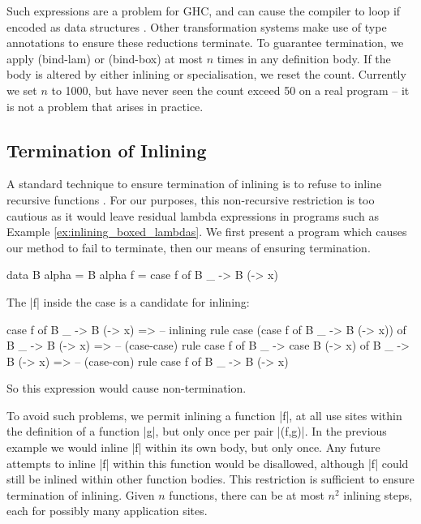 \documentclass{sigplanconf}
\begin{document}
Such expressions are a problem for GHC, and can cause the compiler to loop if encoded as data structures \cite{spj:inlining}. Other transformation systems \cite{chin:higher_order_removal} make use of type annotations to ensure these reductions terminate. To guarantee termination, we apply (bind-lam) or (bind-box) at most $n$ times in any definition body. If the body is altered by either inlining or specialisation, we reset the count. Currently we set $n$ to 1000, but have never seen the count exceed 50 on a real program -- it is not a problem that arises in practice.

\subsection{Termination of Inlining}

A standard technique to ensure termination of inlining is to refuse to inline recursive functions \cite{spj:inlining}. For our purposes, this non-recursive restriction is too cautious as it would leave residual lambda expressions in programs such as Example \ref{ex:inlining_boxed_lambdas}. We first present a program which causes our method to fail to terminate, then our means of ensuring termination.

\begin{example}
\begin{code}
data B alpha = B alpha
f = case  f of
          B _ -> B (\x -> x)
\end{code}

\noindent The |f| inside the case is a candidate for inlining:

\ignore\begin{code}
case f of B _ -> B (\x -> x)
    => -- inlining rule
case (case f of B _ -> B (\x -> x)) of B _ -> B (\x -> x)
    => -- (case-case) rule
case f of B _ -> case B (\x -> x) of B _ -> B (\x -> x)
    => -- (case-con) rule
case f of B _ -> B (\x -> x)
\end{code}

\noindent So this expression would cause non-termination.
\end{example}

To avoid such problems, we permit inlining a function |f|, at all use sites within the definition of a function |g|, but only once per pair |(f,g)|. In the previous example we would inline |f| within its own body, but only once. Any future attempts to inline |f| within this function would be disallowed, although |f| could still be inlined within other function bodies. This restriction is sufficient to ensure termination of inlining. Given $n$ functions, there can be at most $n^2$ inlining steps, each for possibly many application sites.
\end{document}
